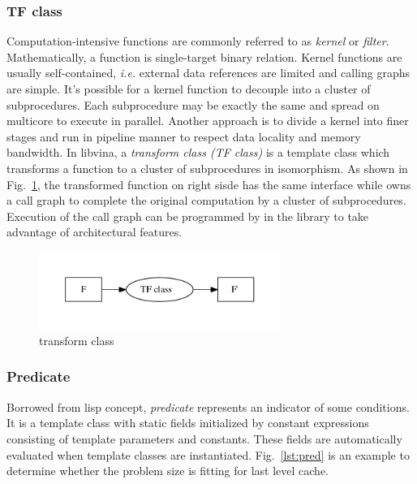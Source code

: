 \subsubsection{TF class}
Computation-intensive functions are commonly referred to as
\emph{kernel} or \emph{filter}. Mathematically, a function is
single-target binary relation. Kernel functions are usually
self-contained, \textit{i.e.} external data references are limited and
calling graphs are simple. It's possible for a kernel function to
decouple into a cluster of subprocedures. Each subprocedure may be
exactly the same and spread on multicore to execute in
parallel.  Another approach is to divide a kernel into finer stages
and run in pipeline manner to respect data locality and memory bandwidth. In
libvina, a \emph{transform class (TF class)} is a template class which
transforms a function to a cluster of subprocedures in isomorphism. As
shown in Fig.~\ref{fig:tfcls}, the transformed function on right sisde
has the same interface while owns a call graph to complete the
original computation by a cluster of subprocedures. Execution of the
call graph can be programmed by in the library to take advantage of
architectural features.

\begin{figure}
\centering
\includegraphics[width=3.1in]{map-class}
\caption{transform class}\label{fig:tfcls}
\end{figure}


\subsubsection{Predicate}
Borrowed from lisp concept, \emph{predicate} represents an indicator
of some conditions. It is a template class with static
fields initialized by constant expressions consisting of template
parameters and constants. These fields are automatically evaluated
when template classes are instantiated. Fig.~\ref{lst:pred} is an example to determine whether the problem size is fitting for last level cache.

